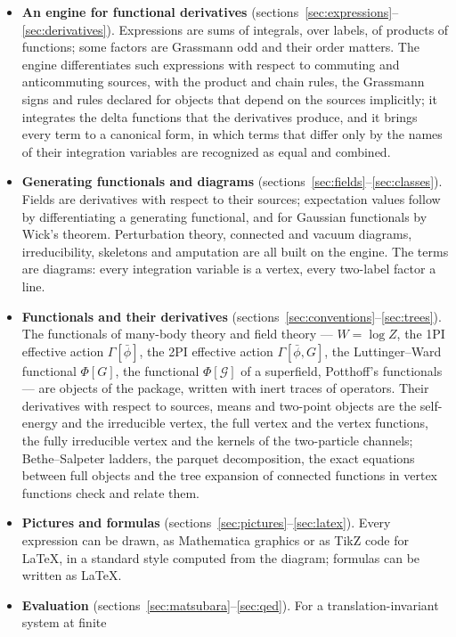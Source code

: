 \documentclass[11pt,a4paper]{article}
\begin{document}
\begin{itemize}
\item \textbf{An engine for functional derivatives} (sections~\ref{sec:expressions}--\ref{sec:derivatives}). Expressions
  are sums of integrals, over labels, of products of functions; some factors are Grassmann odd and their order matters.
  The engine differentiates such expressions with respect to commuting and anticommuting sources, with the product and
  chain rules, the Grassmann signs and rules declared for objects that depend on the sources implicitly; it integrates
  the delta functions that the derivatives produce, and it brings every term to a canonical form, in which terms that
  differ only by the names of their integration variables are recognized as equal and combined.
\item \textbf{Generating functionals and diagrams} (sections~\ref{sec:fields}--\ref{sec:classes}). Fields are
  derivatives with respect to their sources; expectation values follow by differentiating a generating functional, and
  for Gaussian functionals by Wick's theorem. Perturbation theory, connected and vacuum diagrams, irreducibility,
  skeletons and amputation are all built on the engine. The terms are diagrams: every integration variable is a vertex,
  every two-label factor a line.
\item \textbf{Functionals and their derivatives} (sections~\ref{sec:conventions}--\ref{sec:trees}). The functionals of
  many-body theory and field theory --- $W=\log Z$, the 1PI effective action $\Gamma[\bar\phi]$, the 2PI effective action
  $\Gamma[\bar\phi,G]$, the Luttinger--Ward functional $\Phi[G]$, the functional $\Phi[\mathcal G]$ of a superfield, Potthoff's
  functionals --- are objects of the package, written with inert traces of operators. Their derivatives with respect to
  sources, means and two-point objects are the self-energy and the irreducible vertex, the full vertex and the vertex
  functions, the fully irreducible vertex and the kernels of the two-particle channels; Bethe--Salpeter ladders, the
  parquet decomposition, the exact equations between full objects and the tree expansion of connected functions in
  vertex functions check and relate them.
\item \textbf{Pictures and formulas} (sections~\ref{sec:pictures}--\ref{sec:latex}). Every expression can be drawn, as
  Mathematica graphics or as TikZ code for \LaTeX{}, in a standard style computed from the diagram; formulas can be
  written as \LaTeX{}.
\item \textbf{Evaluation} (sections~\ref{sec:matsubara}--\ref{sec:qed}). For a translation-invariant system at finite

\end{itemize}
\end{document}
